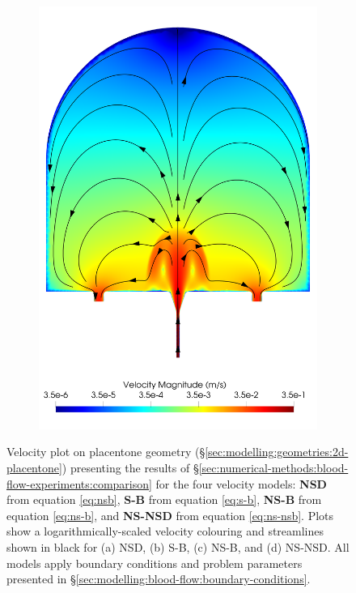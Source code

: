\begin{figure}
\begin{subfigure}[b]{0.45\textwidth}
                    \includegraphics[width=\textwidth]{diagrams/results-modelling/velocity-transport/meshandsoln_dg_velocity_placentone_ns-nsb_velocity-log.png}
                    \caption{}
                    \label{fig:4-models-placentone:ns-nsb}
                \end{subfigure}
                \caption{Velocity plot on placentone geometry (\S\ref{sec:modelling:geometries:2d-placentone}) presenting the results of \S\ref{sec:numerical-methods:blood-flow-experiments:comparison} for the four velocity models: \textbf{NSD} from equation \eqref{eq:nsb}, \textbf{S-B} from equation \eqref{eq:s-b}, \textbf{NS-B} from equation \eqref{eq:ns-b}, and \textbf{NS-NSD} from equation \eqref{eq:ns-nsb}. Plots show a logarithmically-scaled velocity colouring and streamlines shown in black for (a) NSD, (b) S-B, (c) NS-B, and (d) NS-NSD. All models apply boundary conditions and problem parameters presented in \S\ref{sec:modelling:blood-flow:boundary-conditions}.}
                \label{fig:4-models-placentone}
            \end{figure}
    
